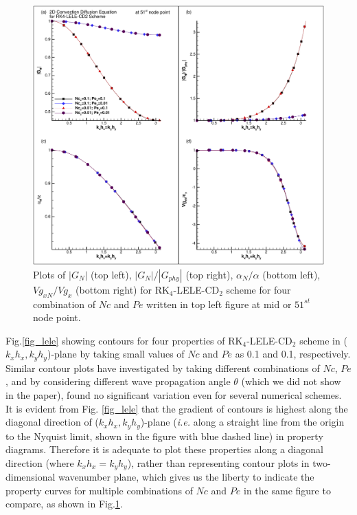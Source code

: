 \documentclass[showpacs,preprintnumbers,amsmath,amssymb]{revtex4-1} %
\begin{document}
\begin{figure}[h]
\begin{center}
\includegraphics[width=150mm]{prop_LELE_mid_pt.pdf}
\end{center}    
\raggedleft
\caption{Plots of $|G_N|$ (top left), $|G_N|/|G_{phy}|$ (top right), $\alpha_N/\alpha$ (bottom left), $Vg_{xN}/Vg_x$ (bottom right) for RK$_4$-LELE-CD$_2$ scheme for four combination of $Nc$ and $Pe$ written in top left figure at mid or $51^{st}$ node point.}
\label{fig_lele2}
\end{figure}

Fig.\ref{fig_lele} showing contours for four properties of RK$_4$-LELE-CD$_2$ scheme in ($k_xh_x,k_yh_y$)-plane by taking small values of $Nc$ and $Pe$ as 0.1 and 0.1, respectively. Similar contour plots have investigated by taking different combinations of $Nc$, $Pe$, and by considering different wave propagation angle $\theta$ (which we did not show in the paper), found no significant variation even for several numerical schemes. It is evident from Fig. \ref{fig_lele} that the gradient of contours is highest along the diagonal direction of ($k_xh_x,k_yh_y$)-plane (\textit{i.e.} along a straight line from the origin to the Nyquist limit, shown in the figure with blue dashed line) in property diagrams. Therefore it is adequate to plot these properties along a diagonal direction (where $k_xh_x=k_yh_y$), rather than representing contour plots in two-dimensional wavenumber plane, which gives us the liberty to indicate the property curves for multiple combinations of $Nc$ and $Pe$ in the same figure to compare, as shown in Fig.\ref{fig_lele2}.
\end{document}
